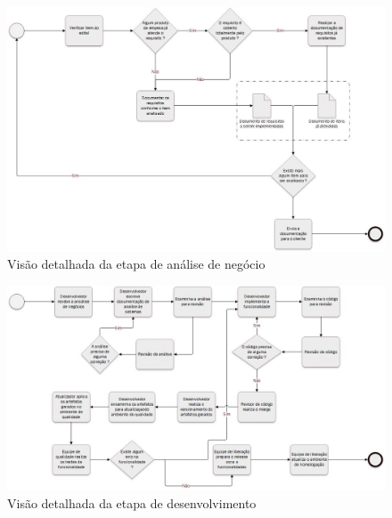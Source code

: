 \documentclass[	DIV=calc,%
							paper=a4,%
							fontsize=12pt,%
							onecolumn]{scrartcl}	 					%
\begin{document}
\begin{figure}
	\centering
	\includegraphics[width=\textwidth]{processo_de_software_BPMN2}
	\caption{Visão detalhada da etapa de análise de negócio}
\end{figure}

\begin{figure}
	\centering
	\includegraphics[width=\textwidth]{processo_de_software_BPMN3}
	\caption{Visão detalhada da etapa de desenvolvimento}
\end{figure}
\end{document}
